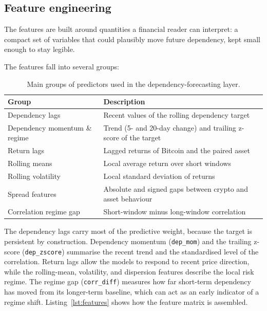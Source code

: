 \subsection{Feature engineering}

The features are built around quantities a financial reader can interpret: a compact set of variables that could plausibly move future dependency, kept small enough to stay legible.

The features fall into several groups:

\begin{table}[H]
    \centering
    \caption{Main groups of predictors used in the dependency-forecasting layer.}
    \label{tab:feature_groups}
    \begin{tabular}{l p{}}
        \toprule
        Group & Description \\
        \midrule
        Dependency lags & Recent values of the rolling dependency target \\
        Dependency momentum \& regime & Trend (5- and 20-day change) and trailing z-score of the target \\
        Return lags & Lagged returns of Bitcoin and the paired asset \\
        Rolling means & Local average return over short windows \\
        Rolling volatility & Local standard deviation of returns \\
        Spread features & Absolute and signed gaps between crypto and asset behaviour \\
        Correlation regime gap & Short-window minus long-window correlation \\
        \bottomrule
    \end{tabular}
\end{table}

The dependency lags carry most of the predictive weight, because the target is persistent by construction. Dependency momentum (\texttt{dep\_mom}) and the trailing z-score (\texttt{dep\_zscore}) summarise the recent trend and the standardised level of the correlation. Return lags allow the models to respond to recent price direction, while the rolling-mean, volatility, and dispersion features describe the local risk regime. The regime gap (\texttt{corr\_diff}) measures how far short-term dependency has moved from its longer-term baseline, which can act as an early indicator of a regime shift. Listing~\ref{lst:features} shows how the feature matrix is assembled.

